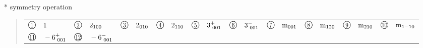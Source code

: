 \documentclass[fleqn,10pt,landscape]{jsarticle}
\begin{document}
* symmetry operation
\begin{quote}
\begin{tabular}{llllllllll}
$ {\ooalign{\hfil\resizebox{.8\width}{\height}{1}\hfil\crcr\raise.1ex\hbox{\large$\bigcirc$}}}\quad 1 $ & $ {\ooalign{\hfil\resizebox{.8\width}{\height}{2}\hfil\crcr\raise.1ex\hbox{\large$\bigcirc$}}}\quad 2{}_{100} $ & $ {\ooalign{\hfil\resizebox{.8\width}{\height}{3}\hfil\crcr\raise.1ex\hbox{\large$\bigcirc$}}}\quad 2{}_{010} $ & $ {\ooalign{\hfil\resizebox{.8\width}{\height}{4}\hfil\crcr\raise.1ex\hbox{\large$\bigcirc$}}}\quad 2{}_{110} $ & $ {\ooalign{\hfil\resizebox{.8\width}{\height}{5}\hfil\crcr\raise.1ex\hbox{\large$\bigcirc$}}}\quad 3^{+}_{\,\,001} $ & $ {\ooalign{\hfil\resizebox{.8\width}{\height}{6}\hfil\crcr\raise.1ex\hbox{\large$\bigcirc$}}}\quad 3^{-}_{\,\,001} $ & $ {\ooalign{\hfil\resizebox{.8\width}{\height}{7}\hfil\crcr\raise.1ex\hbox{\large$\bigcirc$}}}\quad {\rm m}_{001} $ & $ {\ooalign{\hfil\resizebox{.8\width}{\height}{8}\hfil\crcr\raise.1ex\hbox{\large$\bigcirc$}}}\quad {\rm m}_{120} $ & $ {\ooalign{\hfil\resizebox{.8\width}{\height}{9}\hfil\crcr\raise.1ex\hbox{\large$\bigcirc$}}}\quad {\rm m}_{210} $ & $ {\ooalign{\hfil\resizebox{.8\width}{\height}{10}\hfil\crcr\raise.1ex\hbox{\large$\bigcirc$}}}\quad {\rm m}_{1-10} $ \\
$ {\ooalign{\hfil\resizebox{.8\width}{\height}{11}\hfil\crcr\raise.1ex\hbox{\large$\bigcirc$}}}\quad -6^{+}_{\,\,001} $ & $ {\ooalign{\hfil\resizebox{.8\width}{\height}{12}\hfil\crcr\raise.1ex\hbox{\large$\bigcirc$}}}\quad -6^{-}_{\,\,001} $ & $  $ & $  $ & $  $ & $  $ & $  $ & $  $ & $  $ & $  $
\end{tabular}
\end{quote}
\end{document}
